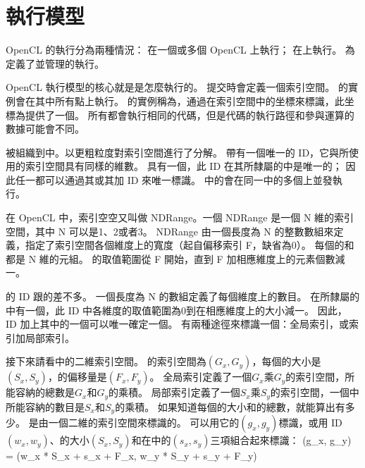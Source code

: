 
\section{執行模型}
OpenCL 的執行分為兩種情況：
在一個或多個 {\ftEmp OpenCL} 上執行；
在上執行。
為定義了並管理的執行。

OpenCL 執行模型的核心就是是怎麼執行的。
提交時會定義一個索引空間。
的實例會在其中所有點上執行。
的實例稱為，通過在索引空間中的坐標來標識，此坐標為提供了一個。
所有都會執行相同的代碼，但是代碼的執行路徑和參與運算的數據可能會不同。

被組織到中。以更粗粒度對索引空間進行了分解。
帶有一個唯一的 ID，它與所使用的索引空間具有同樣的維數。
具有一個，此 ID 在其所隸屬的中是唯一的；
因此任一都可以通過其或其加 ID 來唯一標識。
中的會在同一中的多個上並發執行。

在 OpenCL 中，索引空空又叫做 NDRange。一個 NDRange 是一個 N 維的索引空間，其中 N 可以是1、2或者3。
NDRange 由一個長度為 N 的整數數組來定義，指定了索引空間各個維度上的寬度（起自偏移索引 F，缺省為0）。
每個的和都是 N 維的元組。
的取值範圍從 F 開始，直到 F 加相應維度上的元素個數減一。

的 ID 跟的差不多。
一個長度為 N 的數組定義了每個維度上的數目。
在所隸屬的中有一個，此 ID 中各維度的取值範圍為0到在相應維度上的大小減一。
因此， ID 加上其中的一個可以唯一確定一個。
有兩種途徑來標識一個：全局索引，或索引加局部索引。

接下來請看中的二維索引空間。
的索引空間為$(G_x, G_y)$，每個的大小是$(S_x, S_y)$，的偏移量是$(F_x, F_y)$。
全局索引定義了一個$G_x$乘$G_y$的索引空間，所能容納的總數是$G_x$和$G_y$的乘積。
局部索引定義了一個$S_x$乘$S_y$的索引空間，一個中所能容納的數目是$S_x$和$S_y$的乘積。
如果知道每個的大小和的總數，就能算出有多少。
是由一個二維的索引空間來標識的。
可以用它的$(g_x, g_y)$標識，或用 ID $(w_x, w_y)$、的大小$(S_x, S_y)$和在中的$(s_x, s_y)$三項組合起來標識：
\startformula
(g_x, g_y) = (w_x * S_x + s_x + F_x, w_y * S_y + s_y + F_y)
\stopformula

